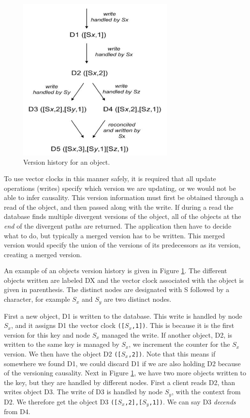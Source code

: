\begin{figure}[h]
    \centering
    \includegraphics[width=0.7\textwidth]{background/figures/versioning}
    \caption{Version history for an object\cite{voldemort}.}
    \label{fig:versioning}
\end{figure}

To use vector clocks in this manner safely, it is required that all update operations (writes) specify which version we are updating, or we would not be able to infer causality.
This version information must first be obtained through a read of the object, and then passed along with the write.
If during a read the database finds multiple divergent versions of the object, all of the objects at the \emph{end} of the divergent paths are returned.
The application then have to decide what to do, but typically a merged version has to be written. This merged version would specify the union of the versions of its predecessors as its version, creating a merged version.

An example of an objects version history is given in Figure \ref{fig:versioning}. 
The different objects written are labeled DX and the vector clock associated with the object is given in parenthesis. The distinct nodes are designated with S followed by a character, for example $S_x$ and $S_y$ are two distinct nodes.

First a new object, D1 is written to the database. This write is handled by node $S_x$, and it assigns D1 the vector clock \texttt{([$S_x$,1])}.
This is because it is the first version for this key and node $S_x$ managed the write. If another object, D2, is written to the same key is managed by $S_x$, we increment the counter for the $S_x$ version. We then have the object D2 \texttt{([$S_x$,2])}. Note that this means if somewhere we found D1, we could discard D1 if we are also holding D2 because of the versioning causality.
Next in Figure \ref{fig:versioning}, we have two more objects written to the key, but they are handled by different nodes.
First a client reads D2, than writes object D3. The write of D3 is handled by node $S_y$, with the context from D2. We therefore get the object D3 \texttt{([$S_x$,2],[$S_y$,1])}. We can say D3 \emph{decends} from D4.

